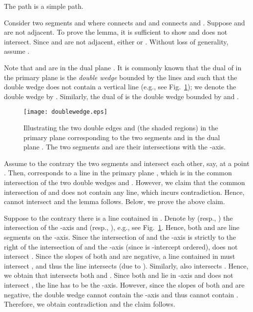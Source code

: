 \documentclass{llncs}
\newenvironment{myproof}{\noindent {\textbf{Proof:}}\rm}{\hfill \rm}
\begin{document}
\begin{lemma}\label{lem:simple}
The path  is a simple path.
\end{lemma}
\begin{myproof}
Consider two segments  and  where  connects 
and  and  connects  and . Suppose
 and  are not adjacent. To prove the lemma, it is sufficient
to show  and  does not intersect.
Since  and  are not adjacent, either  or .
Without loss of generality, assume .


Note that  and  are in the dual plane .
It is commonly known \cite{ref:deBergCo08} that
the dual of  in the primary plane  is the {\em double
wedge} bounded by the lines  and  such that
the double wedge does not contain a vertical line
(e.g., see Fig.~\ref{fig:doublewedge}); we denote the double wedge by .
Similarly, the dual of  is the double wedge  bounded by
 and .

\begin{figure}[t]
\begin{minipage}[t]{\linewidth}
\begin{center}
\texttt{[image: doublewedge.eps]}
\caption{\footnotesize Illustrating the two double edges  and
 (the shaded
regions) in the primary plane  corresponding to the two segments
 and  in the dual plane . The two segments  and
 are their intersections with the -axis.}\label{fig:doublewedge}
\end{center}
\end{minipage}
\vspace*{-0.15in}
\end{figure}


Assume to the contrary the two segments  and  intersect each
other, say, at a point .
Then,  corresponds to a line in the primary
plane , which
is in the common intersection of the two double wedges 
and . However, we claim that the
common intersection of  and  does not contain any
line, which incurs contradiction. Hence,  cannot intersect 
and the lemma follows. Below, we prove the above claim.

Suppose to the contrary there is a line  contained in
. Denote by  (resp., ) the
intersection of the -axis and  (resp., ), e.g.,
see Fig.~\ref{fig:doublewedge}. Hence, both  and  are line
segments on the -axis. Since the intersection of
 and the -axis is strictly to the right of the intersection of
 and the -axis (since  is -intercept
ordered),  does not intersect . Since the slopes of both
 and  are negative, a line contained in
 must intersect , and thus the line  intersects 
(due to ).
Similarly,  also intersects . Hence, we obtain that 
intersects both  and . Since both  and  lie in
-axis and  does not intersect ,
the line  has to be the -axis. However, since the slopes of both
 and  are negative, the
double wedge  cannot contain the -axis and thus cannot
contain . Therefore, we obtain contradiction and the claim follows.
\end{myproof}
\end{document}
